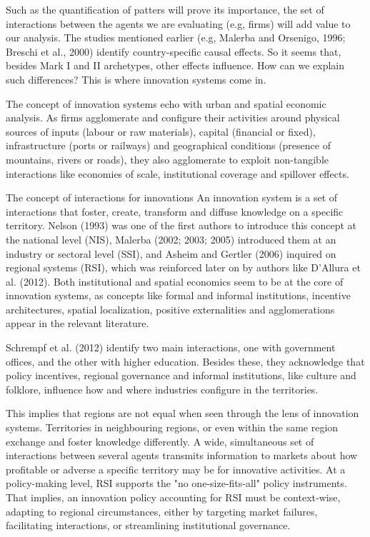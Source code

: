 \documentclass[12pt,a4paper]{article}
\begin{document}
Such as the quantification of patters will prove its importance, the set of interactions between the agents we are evaluating (e.g, firms) will add value to our analysis. The studies mentioned earlier (e.g, Malerba and Orsenigo, 1996; Breschi et al., 2000) identify country-specific causal effects. So it seems that, besides Mark I and II archetypes, other effects influence. How can we explain such differences? This is where innovation systems come in.

The concept of innovation systems echo with urban and spatial economic analysis. As firms agglomerate and configure their activities around physical sources of inputs (labour or raw materials), capital (financial or fixed), infrastructure (ports or railways) and geographical conditions (presence of mountains, rivers or roads), they also agglomerate to exploit non-tangible interactions like economies of scale, institutional coverage and spillover effects. 

The concept of interactions for innovations An innovation system is a set of interactions that foster, create, transform and diffuse knowledge on a specific territory. Nelson (1993) was one of the first authors to introduce this concept at the national level (NIS), Malerba (2002; 2003; 2005) introduced them at an industry or sectoral level (SSI), and  Asheim and Gertler (2006) inquired on regional systems (RSI), which was reinforced later on by authors like D’Allura et al. (2012). Both institutional and spatial economics seem to be at the core of innovation systems, as concepts like formal and informal institutions, incentive architectures, spatial localization, positive externalities and agglomerations appear in the relevant literature.

Schrempf et al. (2012) identify two main interactions, one with government offices, and the other with higher education. Besides these, they acknowledge that policy incentives, regional governance and informal institutions, like culture and folklore, influence how and where industries configure in the territories.

This implies that regions are not equal when seen through the lens of innovation systems. Territories in neighbouring regions, or even within the same region exchange and foster knowledge differently. A wide, simultaneous set of interactions between several agents transmits information to markets about how profitable or adverse a specific territory may be for innovative activities. At a policy-making level, RSI supports the "no one‐size‐fits‐all" policy instruments. That implies, an innovation policy accounting for RSI must be context‐wise, adapting to regional circumstances, either by targeting market failures, facilitating interactions, or streamlining institutional governance. 
\end{document}
